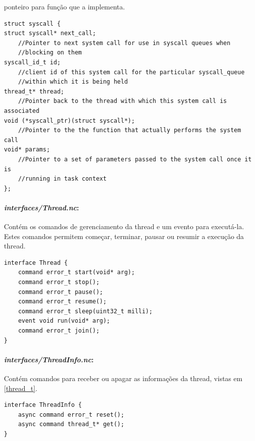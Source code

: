 ponteiro para função que a implementa.
\begin{lstlisting}
struct syscall {
struct syscall* next_call;        
    //Pointer to next system call for use in syscall queues when 
    //blocking on them
syscall_id_t id;                  
    //client id of this system call for the particular syscall_queue 
    //within which it is being held
thread_t* thread;                 
    //Pointer back to the thread with which this system call is associated
void (*syscall_ptr)(struct syscall*);   
    //Pointer to the the function that actually performs the system call
void* params;                     
    //Pointer to a set of parameters passed to the system call once it is 
    //running in task context
};
\end{lstlisting}

\paragraph{\textit{interfaces/Thread.nc}:} Contém os comandos de gerenciamento da thread e um evento para executá-la.
Estes comandos permitem começar, terminar, pausar ou resumir a execução da thread.
\begin{lstlisting}
interface Thread {
    command error_t start(void* arg);
    command error_t stop();
    command error_t pause();
    command error_t resume();
    command error_t sleep(uint32_t milli);
    event void run(void* arg);
    command error_t join();
}  
\end{lstlisting}

\paragraph{\textit{interfaces/ThreadInfo.nc}:} Contém comandos para receber ou apagar as informações da thread,
vistas em \ref{thread_t}. 
\begin{lstlisting}
interface ThreadInfo {
    async command error_t reset();
    async command thread_t* get();
} 
\end{lstlisting}

